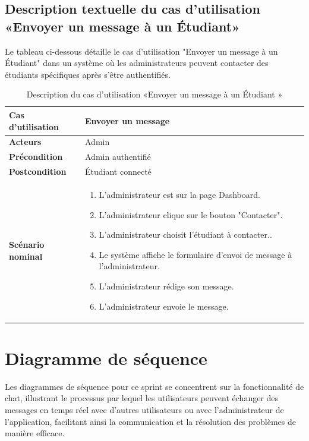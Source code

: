\begin{sloppypar}
\subsection{Description textuelle du cas d’utilisation «Envoyer un message à un Étudiant»}
\vspace{-4mm}
Le tableau ci-dessous détaille le cas d'utilisation "Envoyer un message à un Étudiant" dans un système où les administrateurs peuvent contacter des étudiants spécifiques après s'être authentifiés.
\vspace{-3mm}
\begin{table}[h]
\centering
\begin{tabular}{|p{3cm}|p{12cm}|}
\hline
\textbf{Cas d'utilisation } & Envoyer un message  \\
\hline
\textbf{Acteurs} &  Admin \\
\hline
\textbf{Précondition} & Admin authentifié \\
\hline
\textbf{Postcondition} &   Étudiant connecté\\
\hline
\textbf{Scénario nominal} &
\begin{enumerate}
   \item L'administrateur est sur la page Dashboard.
    \item L'administrateur clique sur le bouton "Contacter".
    \item L'administrateur choisit l'étudiant à contacter..
    \item Le système affiche le formulaire d'envoi de message à l'administrateur.
    \item L'administrateur rédige son message.
    \item L'administrateur envoie le message.
\end{enumerate} \\
\hline
\end{tabular}
\caption{Description du cas d’utilisation «Envoyer un message à un Étudiant »}
\end{table}
\vspace{-1.9cm}
\section{Diagramme de séquence }
\vspace{-4mm}
Les diagrammes de séquence pour ce sprint se concentrent sur la fonctionnalité de chat, illustrant le processus par lequel les utilisateurs peuvent échanger des messages en temps réel avec d'autres utilisateurs ou avec l'administrateur de l'application, facilitant ainsi la communication et la résolution des problèmes de manière efficace.
\vspace{-1cm}

\end{sloppypar}
